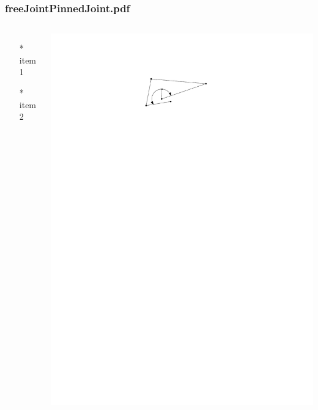 \begin{frame} \frametitle{freeJointPinnedJoint.pdf}
    \begin{columns}[c]
        \begin{itemize}
            \item[*] item 1
            \item[*] item 2
        \end{itemize}
        \begin{minipage}{\linewidth}
            \begin{center}
            \includegraphics[width=.9\textwidth]{graphics/freeJointPinnedJoint.pdf}
            \label{gfx:freeJointPinnedJoint.pdf}
            \end{center}
        \end{minipage}
    \end{columns}
\end{frame}
